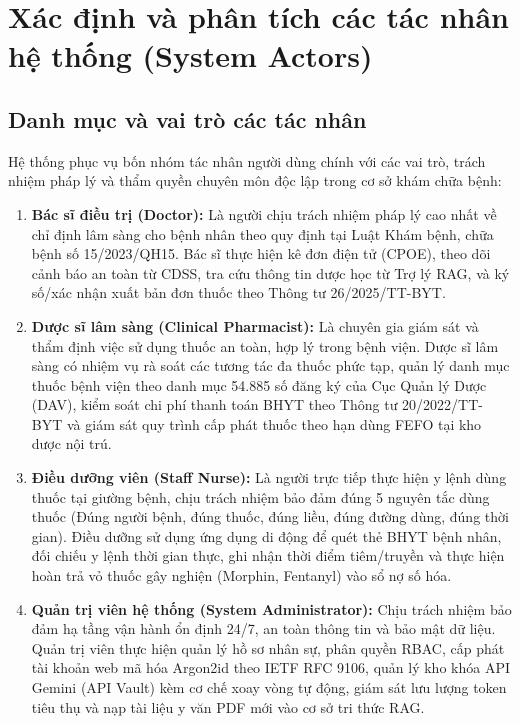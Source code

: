 \section{Xác định và phân tích các tác nhân hệ thống (System Actors)}
\label{sec:system_actors}

\subsection{Danh mục và vai trò các tác nhân}
\label{subsec:actor_list}

Hệ thống phục vụ bốn nhóm tác nhân người dùng chính với các vai trò, trách nhiệm pháp lý và thẩm quyền chuyên môn độc lập trong cơ sở khám chữa bệnh:

\begin{enumerate}[leftmargin=1.8em]
    \item \textbf{Bác sĩ điều trị (Doctor):} Là người chịu trách nhiệm pháp lý cao nhất về chỉ định lâm sàng cho bệnh nhân theo quy định tại Luật Khám bệnh, chữa bệnh số 15/2023/QH15. Bác sĩ thực hiện kê đơn điện tử (CPOE), theo dõi cảnh báo an toàn từ CDSS, tra cứu thông tin dược học từ Trợ lý RAG, và ký số/xác nhận xuất bản đơn thuốc theo Thông tư 26/2025/TT-BYT.
    \item \textbf{Dược sĩ lâm sàng (Clinical Pharmacist):} Là chuyên gia giám sát và thẩm định việc sử dụng thuốc an toàn, hợp lý trong bệnh viện. Dược sĩ lâm sàng có nhiệm vụ rà soát các tương tác đa thuốc phức tạp, quản lý danh mục thuốc bệnh viện theo danh mục 54.885 số đăng ký của Cục Quản lý Dược (DAV), kiểm soát chi phí thanh toán BHYT theo Thông tư 20/2022/TT-BYT và giám sát quy trình cấp phát thuốc theo hạn dùng FEFO tại kho dược nội trú.
    \item \textbf{Điều dưỡng viên (Staff Nurse):} Là người trực tiếp thực hiện y lệnh dùng thuốc tại giường bệnh, chịu trách nhiệm bảo đảm đúng 5 nguyên tắc dùng thuốc (Đúng người bệnh, đúng thuốc, đúng liều, đúng đường dùng, đúng thời gian). Điều dưỡng sử dụng ứng dụng di động để quét thẻ BHYT bệnh nhân, đối chiếu y lệnh thời gian thực, ghi nhận thời điểm tiêm/truyền và thực hiện hoàn trả vỏ thuốc gây nghiện (Morphin, Fentanyl) vào sổ nợ số hóa.
    \item \textbf{Quản trị viên hệ thống (System Administrator):} Chịu trách nhiệm bảo đảm hạ tầng vận hành ổn định 24/7, an toàn thông tin và bảo mật dữ liệu. Quản trị viên thực hiện quản lý hồ sơ nhân sự, phân quyền RBAC, cấp phát tài khoản web mã hóa Argon2id theo IETF RFC 9106, quản lý kho khóa API Gemini (API Vault) kèm cơ chế xoay vòng tự động, giám sát lưu lượng token tiêu thụ và nạp tài liệu y văn PDF mới vào cơ sở tri thức RAG.
\end{enumerate}

